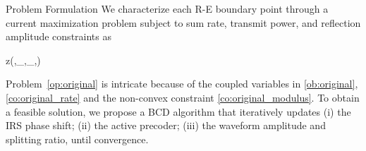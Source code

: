 \documentclass[journal]{IEEEtran}
\begin{document}
	\begin{section}{Problem Formulation}\label{se:problem_formulation}
		We characterize each R-E boundary point through a current maximization problem subject to sum rate, transmit power, and reflection amplitude constraints as
		\begin{maxi!}
			{}{z(\boldsymbol{\phi},_{},_{},\rho)}{\label{op:original}}{\label{ob:original}}
			\label{co:original_rate}
			\label{co:original_power}
			\label{co:original_modulus}
		\end{maxi!}
		Problem~\eqref{op:original} is intricate because of the coupled variables in \eqref{ob:original}, \eqref{co:original_rate} and the non-convex constraint \eqref{co:original_modulus}. To obtain a feasible solution, we propose a BCD algorithm that iteratively updates (i) the IRS phase shift; (ii) the active precoder; (iii) the waveform amplitude and splitting ratio, until convergence.



\end{section}
\end{document}
